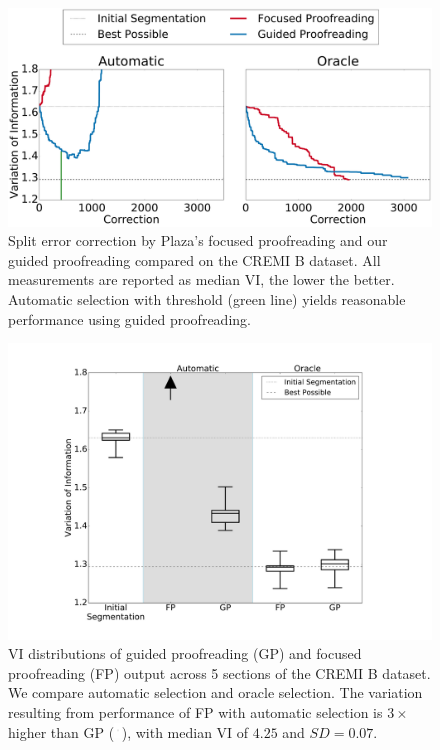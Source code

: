 \begin{figure}[t]
\centering
\includegraphics[width=\linewidth]{gfx/cremiB_trails.pdf}
\caption{Split error correction by Plaza's focused proofreading and our guided proofreading compared on the CREMI B dataset. All measurements are reported as median VI, the lower the better. Automatic selection with threshold (green line) yields reasonable performance using guided proofreading.}
\label{fig:cremiBtrails}
\end{figure}

\begin{figure}[t]
\centering
\includegraphics[width=.9\linewidth]{gfx/cremiBboxplot.pdf}
\caption{VI distributions of guided proofreading (GP) and focused proofreading (FP) output across 5 sections of the CREMI B dataset. We compare automatic selection and oracle selection. The variation resulting from performance of FP with automatic selection is $3\times$ higher than GP (\protect\includegraphics[width=0.2cm]{gfx/arrow.pdf}), with median VI of $4.25$ and $SD=0.07$.}
\label{fig:cremiBboxplot}
\end{figure}

